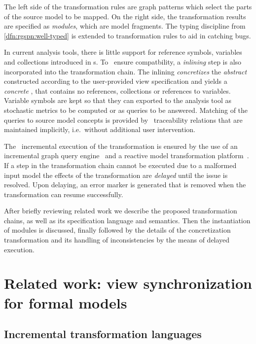 The left side of the transformation rules are graph patterns which select the parts of the source model to be mapped. On the right side, the transformation results are specified as \emph{ modules}, which are  model fragments. The typing discipline from \vref{dfn:rgspn:well-typed} is extended to transformation rules to aid in catching bugs.

In current analysis tools, there is little support for reference symbols, variables and collections introduced in s. To ~ensure compatbility, a \emph{inlining} step is also incorporated into the transformation chain. The inlining \emph{concretizes} the \emph{abstract}  constructed according to the user-provided view specification and yields a \emph{concrete} , that contains no references, collections or references to variables. Variable symbols are kept so that they can exported to the analysis tool as stochastic metrics to be computed or as queries to be answered. Matching of the queries to source model concepts is provided by ~traceability relations that are maintained implicitly, i.e.~without additional user intervention.

The ~incremental execution of the transformation is ensured by the use of an incremental graph query engine~\citep{Ujhelyi15incquery} and a reactive model transformation platform~\citep{Bergmann15viatra}. If a step in the transformation chain cannot be executed due to a malformed input model the effects of the transformation are \emph{delayed} until the issue is resolved. Upon delaying, an error marker is generated that is removed when the transformation can resume successfully.

After briefly reviewing related work we describe the proposed transformation chains, as well as its specification language and semantics. Then the instantiation of  modules is discussed, finally followed by the details of the concretization transformation and its handling of inconsistencies by the means of delayed execution.

\section{Related work: view synchronization for formal models}
\label{chap:transform:relwork}


\subsection{Incremental transformation languages}

